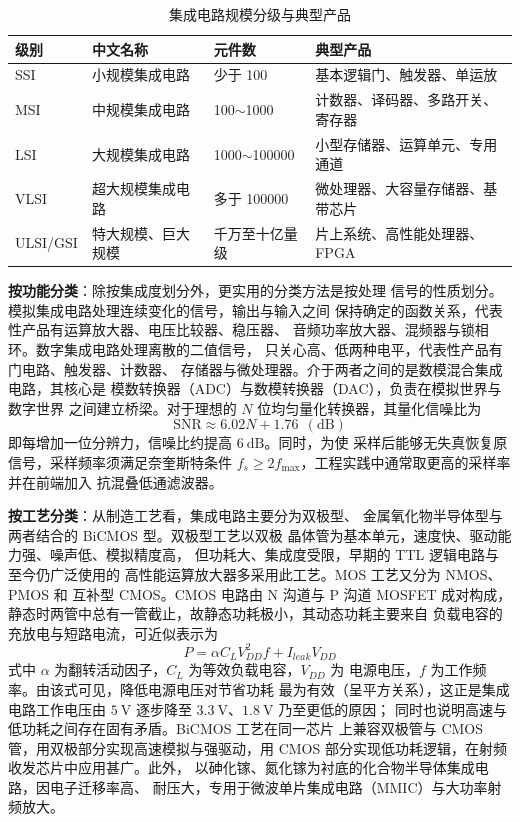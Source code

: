 \begin{table}[htbp]
\centering
\caption{集成电路规模分级与典型产品}
\begin{tabular}{|p{2.0cm}|p{3.0cm}|p{2.6cm}|p{4.0cm}|}
\hline
\textbf{级别} & \textbf{中文名称} & \textbf{元件数} & \textbf{典型产品} \\
\hline
SSI & 小规模集成电路 & 少于 100 & 基本逻辑门、触发器、单运放 \\
\hline
MSI & 中规模集成电路 & 100$\sim$1000 & 计数器、译码器、多路开关、寄存器 \\
\hline
LSI & 大规模集成电路 & 1000$\sim$100000 & 小型存储器、运算单元、专用通道 \\
\hline
VLSI & 超大规模集成电路 & 多于 100000 & 微处理器、大容量存储器、基带芯片 \\
\hline
ULSI/GSI & 特大规模、巨大规模 & 千万至十亿量级 & 片上系统、高性能处理器、FPGA \\
\hline
\end{tabular}
\end{table}

\textbf{按功能分类}：除按集成度划分外，更实用的分类方法是按处理
信号的性质划分。模拟集成电路处理连续变化的信号，输出与输入之间
保持确定的函数关系，代表性产品有运算放大器、电压比较器、稳压器、
音频功率放大器、混频器与锁相环。数字集成电路处理离散的二值信号，
只关心高、低两种电平，代表性产品有门电路、触发器、计数器、
存储器与微处理器。介于两者之间的是数模混合集成电路，其核心是
模数转换器（ADC）与数模转换器（DAC），负责在模拟世界与数字世界
之间建立桥梁。对于理想的 $N$ 位均匀量化转换器，其量化信噪比为
\begin{equation}
\mathrm{SNR} \approx 6.02N + 1.76 \ \ (\mathrm{dB})
\end{equation}
即每增加一位分辨力，信噪比约提高 $6\ \mathrm{dB}$。同时，为使
采样后能够无失真恢复原信号，采样频率须满足奈奎斯特条件
$f_s \geq 2f_{\max}$，工程实践中通常取更高的采样率并在前端加入
抗混叠低通滤波器。

\textbf{按工艺分类}：从制造工艺看，集成电路主要分为双极型、
金属氧化物半导体型与两者结合的 BiCMOS 型。双极型工艺以双极
晶体管为基本单元，速度快、驱动能力强、噪声低、模拟精度高，
但功耗大、集成度受限，早期的 TTL 逻辑电路与至今仍广泛使用的
高性能运算放大器多采用此工艺。MOS 工艺又分为 NMOS、PMOS 和
互补型 CMOS。CMOS 电路由 N 沟道与 P 沟道 MOSFET 成对构成，
静态时两管中总有一管截止，故静态功耗极小，其动态功耗主要来自
负载电容的充放电与短路电流，可近似表示为
\begin{equation}
P = \alpha C_L V_{DD}^2 f + I_{leak} V_{DD}
\end{equation}
式中 $\alpha$ 为翻转活动因子，$C_L$ 为等效负载电容，$V_{DD}$ 为
电源电压，$f$ 为工作频率。由该式可见，降低电源电压对节省功耗
最为有效（呈平方关系），这正是集成电路工作电压由 $5\ \mathrm{V}$
逐步降至 $3.3\ \mathrm{V}$、$1.8\ \mathrm{V}$ 乃至更低的原因；
同时也说明高速与低功耗之间存在固有矛盾。BiCMOS 工艺在同一芯片
上兼容双极管与 CMOS 管，用双极部分实现高速模拟与强驱动，用
CMOS 部分实现低功耗逻辑，在射频收发芯片中应用甚广。此外，
以砷化镓、氮化镓为衬底的化合物半导体集成电路，因电子迁移率高、
耐压大，专用于微波单片集成电路（MMIC）与大功率射频放大。

